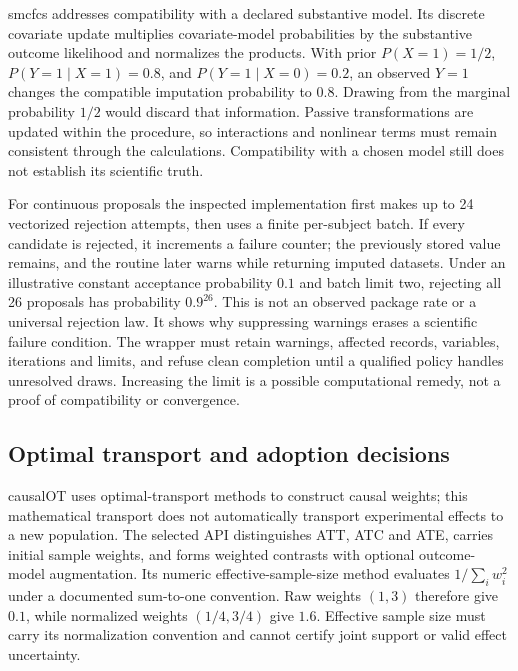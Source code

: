 smcfcs addresses compatibility with a declared substantive model. Its discrete covariate update multiplies covariate-model probabilities by the substantive outcome likelihood and normalizes the products. With prior $P(X=1)=1/2$, $P(Y=1\mid X=1)=0.8$, and $P(Y=1\mid X=0)=0.2$, an observed $Y=1$ changes the compatible imputation probability to $0.8$. Drawing from the marginal probability $1/2$ would discard that information. Passive transformations are updated within the procedure, so interactions and nonlinear terms must remain consistent through the calculations. Compatibility with a chosen model still does not establish its scientific truth.~\citep{exec25_rtm_smcfcs,exec25_rtm_choice}

For continuous proposals the inspected implementation first makes up to 24 vectorized rejection attempts, then uses a finite per-subject batch. If every candidate is rejected, it increments a failure counter; the previously stored value remains, and the routine later warns while returning imputed datasets. Under an illustrative constant acceptance probability $0.1$ and batch limit two, rejecting all 26 proposals has probability $0.9^{26}$. This is not an observed package rate or a universal rejection law. It shows why suppressing warnings erases a scientific failure condition. The wrapper must retain warnings, affected records, variables, iterations and limits, and refuse clean completion until a qualified policy handles unresolved draws. Increasing the limit is a possible computational remedy, not a proof of compatibility or convergence.~\citep{exec25_rtm_smcfcs,exec25_rtm_choice}

\subsection{Optimal transport and adoption decisions}

causalOT uses optimal-transport methods to construct causal weights; this mathematical transport does not automatically transport experimental effects to a new population. The selected API distinguishes ATT, ATC and ATE, carries initial sample weights, and forms weighted contrasts with optional outcome-model augmentation. Its numeric effective-sample-size method evaluates $1/\sum_i w_i^2$ under a documented sum-to-one convention. Raw weights $(1,3)$ therefore give $0.1$, while normalized weights $(1/4,3/4)$ give $1.6$. Effective sample size must carry its normalization convention and cannot certify joint support or valid effect uncertainty.~\citep{exec25_rtm_causalOT,exec25_rtm_choice}

